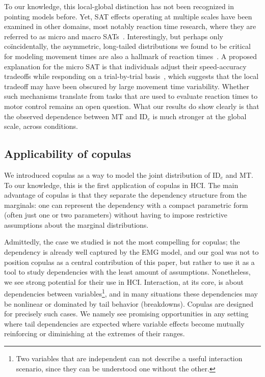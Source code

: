 \documentclass[acmlarge, manuscript,review]{acmart}
\newcommand{\ide}{\ensuremath{{\text{ID}_e}}\xspace}
\begin{document}
To our knowledge, this local-global distinction has not been recognized in pointing models before. Yet, SAT effects operating at multiple scales have been examined in other domains, most notably reaction time research, where they are referred to as micro and macro SATs~\cite{dennis1996,domingue2022}. Interestingly, but perhaps only coïncidentally, the asymmetric, long-tailed distributions we found to be critical for modeling movement times are also a hallmark of reaction times~\cite{luce1991}. A proposed explanation for the micro SAT is that individuals adjust their speed-accuracy tradeoffs while responding on a trial-by-trial basis~\cite{domingue2022}, which suggests that the local tradeoff may have been obscured by large movement time variability. Whether such mechanisms translate from tasks that are used to evaluate reaction times to motor control remains an open question. What our results do show clearly is that the observed dependence between MT and \ide is much stronger at the global scale, across conditions.




\subsection{Applicability of copulas}
We introduced copulas as a way to model the joint distribution of \ide and MT. To our knowledge, this is the first application of copulas in HCI. The main advantage of copulas is that they separate the dependency structure from the marginals: one can represent the dependency with a compact parametric form (often just one or two parameters) without having to impose restrictive assumptions about the marginal distributions.

Admittedly, the case we studied is not the most compelling for copulas; the dependency is already well captured by the EMG model, and our goal was not to position copulas as a central contribution of this paper, but rather to use it as a tool to study dependencies with the least amount of assumptions. Nonetheless, we see strong potential for their use in HCI. Interaction, at its core, is about dependencies between variables\footnote{Two variables that are independent can not describe a useful interaction scenario, since they can be understood one without the other.}, and in many situations these dependencies may be nonlinear or dominated by tail behavior (\eg breakdowns). Copulas are designed for precisely such cases. We namely see promising opportunities %
in any setting where tail dependencies are expected \ie where variable effects become mutually reinforcing or diminishing at the extremes of their ranges.
\end{document}
